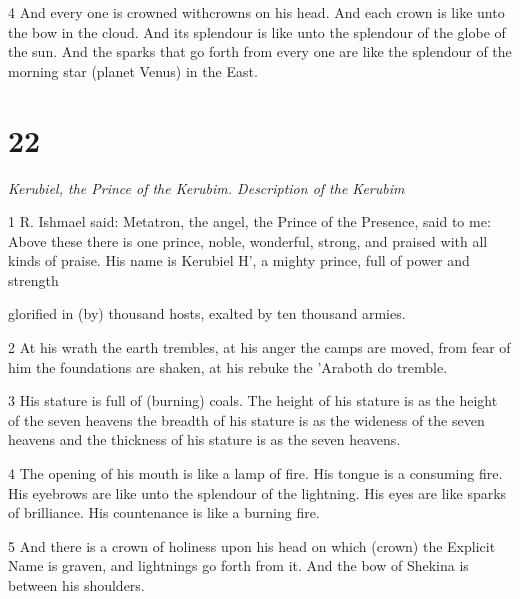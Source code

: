 \par 4 And every one is crowned withcrowns on his head. And each crown is like unto the bow in the cloud. And its splendour is like unto the splendour of the globe of the sun. And the sparks that go forth from every one are like the splendour of the morning star (planet Venus) in the East. 

\chapter{22}

\par \textit{Kerubiel, the Prince of the Kerubim. Description of the Kerubim}

\par 1 R. Ishmael said: Metatron, the angel, the Prince of the Presence, said to me: Above these there is one prince, noble, wonderful, strong, and praised with all kinds of praise. His name is Kerubiel H', a mighty prince, full of power and strength 

\par [AD: a prince of highness, and Highness (is) with him, a righteous prince, and righteousness (is) with him, a holy prince, and holiness (is) with him, a prince] [B: a prince of highness, and with  him (there is) a righteous prince, of righteousness, and with him a  holy prince, of holiness, and with  him (there is) a prince ] glorified in (by) thousand hosts, exalted by ten thousand armies. 

\par 2 At his wrath the earth trembles, at his anger the camps are moved, from fear of him the foundations are shaken, at his rebuke the 'Araboth do tremble. 

\par 3 His stature is full of (burning) coals. The height of his stature is as the height of the seven heavens the breadth of his stature is as the wideness of the seven heavens and the thickness of his stature is as the seven heavens. 

\par 4 The opening of his mouth is like a lamp of fire. His tongue is a consuming fire. His eyebrows are like unto the splendour of the lightning. His eyes are like sparks of brilliance. His countenance is like a burning fire. 

\par 5 And there is a crown of holiness upon his head on which (crown) the Explicit Name is graven, and lightnings go forth from it. And the bow of Shekina is between his shoulders. 

